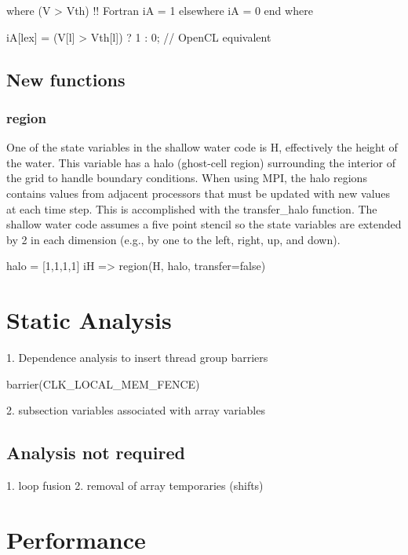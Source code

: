    where (V > Vth)                        !! Fortran
      iA = 1
   elsewhere
      iA = 0
   end where

   iA[lex] = (V[l] > Vth[l]) ? 1 : 0;     // OpenCL equivalent


\subsection{New functions}

\subsubsection{region}

One of the state variables in the shallow water code is H, effectively the
height of the water.  This variable has a halo (ghost-cell region) surrounding
the interior of the grid to handle boundary conditions.  When using
MPI, the halo regions contains values from adjacent processors that must be
updated with new values at each time step.  This is accomplished with the
transfer_halo function.  The shallow water code assumes a five point stencil
so the state variables are extended by 2 in each dimension (e.g., by one to the
left, right, up, and down).

halo = [1,1,1,1]
iH => region(H, halo, transfer=false)

\section{Static Analysis}

1. Dependence analysis to insert thread group barriers

   barrier(CLK_LOCAL_MEM_FENCE)

2. subsection variables associated with array variables

\subsection{Analysis not required}

1. loop fusion
2. removal of array temporaries (shifts)

\section{Performance}



